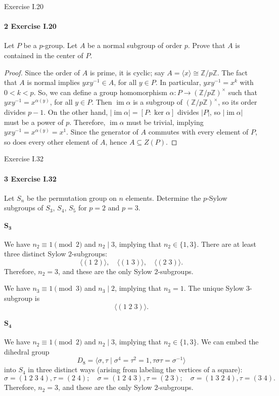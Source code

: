 \documentclass[12pt]{article}
\newlength{\myparskip}
\newenvironment{fullbox}{\begin{lrbox}{\savefullbox}\begin{minipage}{\dimexpr\textwidth-2\fboxsep\relax}\setlength{\parskip}{\myparskip}}{\end{minipage}\end{lrbox}\framebox[\textwidth]{\usebox{\savefullbox}}}
\newenvironment{pbox}[1][]{\begin{fullbox}\ifx#1\empty\else\paragraph{#1}\fi}{\end{fullbox}}
\newcommand{\Z}{\mathbb{Z}}
\newcommand{\<}{\langle}
\renewcommand{\>}{\rangle}
\newcommand{\isom}{\cong}
\DeclareMathOperator{\im}{im}
\begin{document}
\newpage
\begin{pbox}[2 Exercise I.20]
    Let $P$ be a $p$-group. Let $A$ be a normal subgroup of order $p$. Prove that $A$ is contained in the center of $P$.
\end{pbox}

\begin{proof}
    Since the order of $A$ is prime, it is cyclic; say $A = \<x\> \isom \Z/p\Z$. The fact that $A$ is normal implies $yxy^{-1} \in A$, for all $y \in P$. In particular, $yxy^{-1} = x^k$ with $0 < k < p$. So, we can define a group homomorphism $\alpha : P \to (\Z/p\Z)^\times$ such that $yxy^{-1} = x^{\alpha(y)}$, for all $y \in P$. Then $\im\alpha$ is a subgroup of $(\Z/p\Z)^\times$, so its order divides $p - 1$. On the other hand, $|\im\alpha| = [P : \ker\alpha]$ divides $|P|$, so $|\im\alpha|$ must be a power of $p$. Therefore, $\im\alpha$ must be trivial, implying $yxy^{-1} = x^{\alpha(y)} = x^1$. Since the generator of $A$ commutes with every element of $P$, so does every other element of $A$, hence $A \subseteq Z(P)$.

\end{proof}



\newpage
\begin{pbox}[3 Exercise I.32]
    Let $S_n$ be the permutation group on $n$ elements. Determine the $p$-Sylow subgroups of $S_3$, $S_4$, $S_5$ for $p = 2$ and $p = 3$.
\end{pbox}

\paragraph{$\mathbf{S_3}$} We have $n_2 \equiv 1 \pmod{2}$ and $n_2 \mid 3$, implying that $n_2 \in \{1, 3\}$. There are at least three distinct Sylow $2$-subgroups:
\[
    \<(1 \; 2)\>, \quad \<(1 \; 3)\>, \quad \<(2 \; 3)\>.
\]
Therefore, $n_2 = 3$, and these are the only Sylow $2$-subgroups.

We have $n_3 \equiv 1 \pmod{3}$ and $n_3 \mid 2$, implying that $n_3 = 1$. The unique Sylow $3$-subgroup is
\[
    \<(1 \; 2 \; 3)\>.
\]

\paragraph{$\mathbf{S_4}$} We have $n_2 \equiv 1 \pmod{2}$ and $n_2 \mid 3$, implying that $n_2 \in \{1, 3\}$. We can embed the dihedral group
\[
    D_8 = \<\sigma, \tau \mid \sigma^4 = \tau^2 = 1, \tau\sigma\tau = \sigma^{-1}\>
\]
into $S_4$ in three distinct ways (arising from labeling the vertices of a square):
\[
    \sigma = (1 \; 2 \; 3 \; 4), \tau = (2 \; 4); \quad
    \sigma = (1 \; 2 \; 4 \; 3), \tau = (2 \; 3); \quad
    \sigma = (1 \; 3 \; 2 \; 4), \tau = (3 \; 4).
\]
Therefore, $n_2 = 3$, and these are the only Sylow $2$-subgroups.
\end{document}
